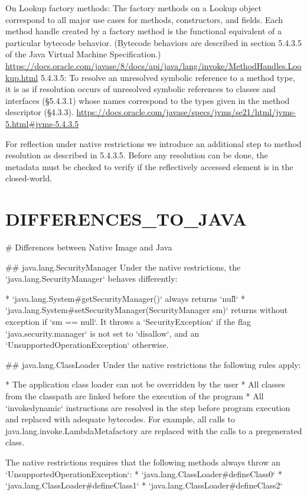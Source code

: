 On Lookup factory methods:
The factory methods on a Lookup object correspond to all major use cases for methods, constructors, and fields. Each method handle created by a factory method is the functional equivalent of a particular bytecode behavior. (Bytecode behaviors are described in section 5.4.3.5 of the Java Virtual Machine Specification.)
\url{https://docs.oracle.com/javase/8/docs/api/java/lang/invoke/MethodHandles.Lookup.html}
5.4.3.5:
To resolve an unresolved symbolic reference to a method type, it is as if resolution occurs of unresolved symbolic references to classes and interfaces (§5.4.3.1) whose names correspond to the types given in the method descriptor (§4.3.3).
\url{https://docs.oracle.com/javase/specs/jvms/se21/html/jvms-5.html#jvms-5.4.3.5}

For reflection under native restrictions we introduce an additional step to method resolution as described in 5.4.3.5. Before any resolution can be done, the metadata must be checked to verify if the reflectively accessed element is in the closed-world.


\section{DIFFERENCES_TO_JAVA}
# Differences between Native Image and Java

## java.lang.SecurityManager
Under the native restrictions, the `java.lang.SecurityManager` behaves differently:

* `java.lang.System#getSecurityManager()` always returns `null̀`
* `java.lang.System#setSecurityManager(SecurityManager sm)` returns without exception if `sm == null`. 
It throws a `SecurityException` if the flag `java.security.manager` is not set to `disallow`, and an 
`UnsupportedOperationException` otherwise.


## java.lang.ClassLoader
Under the native restrictions the following rules apply:

* The application class loader can not be overridden by the user
* All classes from the classpath are linked before the execution of the program
* All `invokedynamic` instructions are resolved in the step before program execution and replaced
  with adequate bytecodes. For example, all calls to java.lang.invoke.LambdaMetafactory are replaced with the calls to a pregenerated class.

The native restrictions requires that the following methods always throw an `UnsupportedOperationException`:
* `java.lang.ClassLoader#defineClass0`
* `java.lang.ClassLoader#defineClass1`
* `java.lang.ClassLoader#defineClass2`

